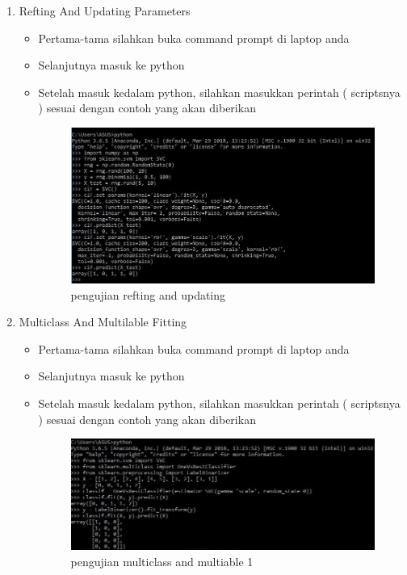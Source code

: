 \begin{itemize}
\begin{itemize}
\begin{enumerate}
\begin{itemize}
\par
\par
\end{itemize}

\item Refting And Updating Parameters
\begin{itemize}
\item Pertama-tama silahkan buka command prompt di laptop anda
\item Selanjutnya masuk ke python 
\item Setelah masuk kedalam python, silahkan masukkan perintah ( scriptsnya ) sesuai dengan contoh yang akan diberikan
\par

\begin{figure}[ht]
\centering
\includegraphics[scale=0.4]{figures/reftingupdating.jpg}
\caption{pengujian refting and updating }
\label{contoh}
\end{figure}

\par
\end{itemize}
\par
\item Multiclass And Multilable Fitting
\begin{itemize}
\item Pertama-tama silahkan buka command prompt di laptop anda
\item Selanjutnya masuk ke python 
\item Setelah masuk kedalam python, silahkan masukkan perintah ( scriptsnya ) sesuai dengan contoh yang akan diberikan
\par

\begin{figure}[ht]
\centering
\includegraphics[scale=0.4]{figures/multiclass1.jpg}
\caption{pengujian multiclass and multiable 1 }
\label{contoh}
\end{figure}


\end{itemize}
\end{enumerate}
\end{itemize}
\end{itemize}

